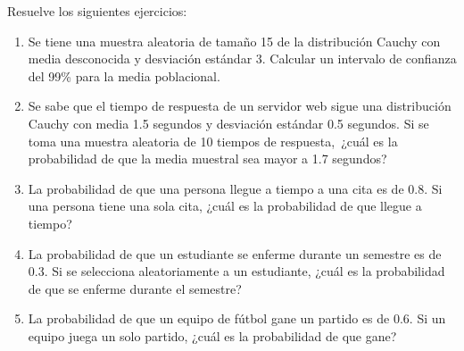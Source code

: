 \begin{Ejer}
Resuelve los siguientes ejercicios:
\begin{enumerate}


\item Se tiene una muestra aleatoria de tama\~no 15 de la distribuci\'on Cauchy con media desconocida y desviaci\'on est\'andar 3. Calcular un intervalo de confianza del 99\% para la media poblacional.

\item Se sabe que el tiempo de respuesta de un servidor web sigue una distribuci\'on Cauchy con media 1.5 segundos y desviaci\'on est\'andar 0.5 segundos. Si se toma una muestra aleatoria de 10 tiempos de respuesta, \,¿cu\'al es la probabilidad de que la media muestral sea mayor a 1.7 segundos?

    \item La probabilidad de que una persona llegue a tiempo a una cita es de 0.8. Si una persona tiene una sola cita, ¿cuál es la probabilidad de que llegue a tiempo?

    \item La probabilidad de que un estudiante se enferme durante un semestre es de 0.3. Si se selecciona aleatoriamente a un estudiante, ¿cuál es la probabilidad de que se enferme durante el semestre?

    \item La probabilidad de que un equipo de fútbol gane un partido es de 0.6. Si un equipo juega un solo partido, ¿cuál es la probabilidad de que gane?


\end{enumerate}
\end{Ejer}
